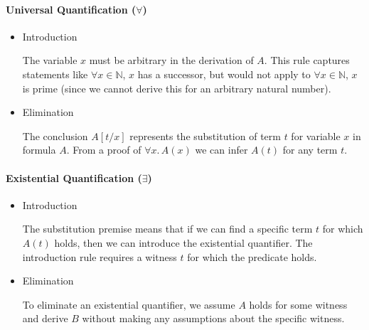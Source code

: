 \paragraph{Universal Quantification ($\forall$)}
\begin{itemize}
    \item Introduction
    \begin{prooftree}
    \end{prooftree}
    The variable $x$ must be arbitrary in the derivation of $A$. 
    This rule captures statements like 
    $\forall x \in \mathbb{N}$, $x$ has a successor, 
    but would not apply to $\forall x \in \mathbb{N}$, $x$ is prime 
    (since we cannot derive this for an arbitrary natural number).
    \item Elimination
    \begin{prooftree}
    \end{prooftree}
    The conclusion $A[t/x]$ represents the substitution of term $t$ for variable $x$ in formula $A$. 
    From a proof of $\forall x.\,A(x)$ we can infer $A(t)$ for any term $t$.
\end{itemize}
\paragraph{Existential Quantification ($\exists$)}
\begin{itemize}
    \item Introduction
    \begin{prooftree}
    \end{prooftree}
    The substitution premise means that if we can find a specific term $t$ for which $A(t)$ holds, 
    then we can introduce the existential quantifier. 
    The introduction rule requires a witness $t$ for which the predicate holds.
    \item Elimination
    \begin{prooftree}
    \end{prooftree}
    To eliminate an existential quantifier, we assume $A$ holds for some witness 
    and derive $B$ without making any assumptions about the specific witness.
\end{itemize}

